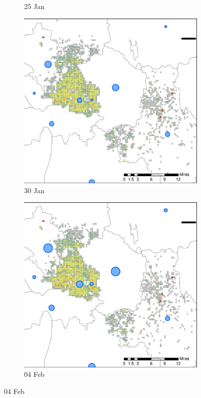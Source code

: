 \documentclass[preprints,ijgi,submit,moreauthors]{Definitions/mdpi}
\begin{document}
\begin{figure}[H]
\begin{subfigure}{.23\textwidth}
        \caption{25 Jan}
    \end{subfigure}
    \begin{subfigure}{.23\textwidth}
        \includegraphics[width=\textwidth]{Figures/Figure7/NewDistrictSSBD2020_01_30.eps}
        \caption{30 Jan}
    \end{subfigure}
        \begin{subfigure}{.23\textwidth}
        \includegraphics[width=\textwidth]{Figures/Figure7/NewDistrictSSBD2020_02_04.eps}
        \caption{04 Feb}
    \end{subfigure}
    

\end{figure}
\end{document}
